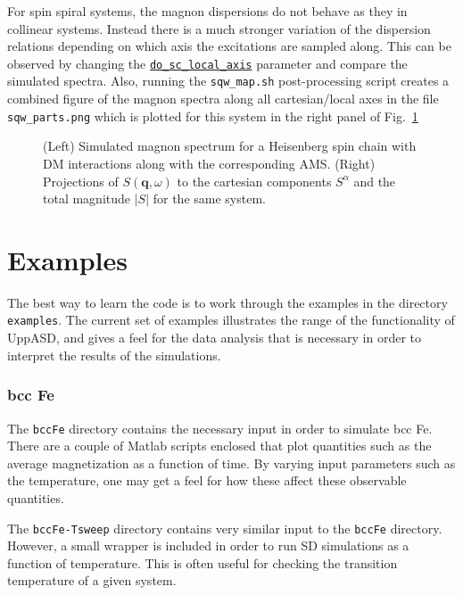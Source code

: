 \documentclass[11pt,fleqn,a4]{book} %
\newcommand{\rkeyword}[1]{\hyperref[#1]{\texttt{#1}}}
\begin{document}
For spin spiral systems, the magnon dispersions do not behave as they in collinear systems. Instead there is a much stronger variation of the dispersion relations depending on which axis the excitations are sampled along. This can be observed by changing the \rkeyword{do_sc_local_axis} parameter and compare the simulated spectra. Also, running the \texttt{sqw_map.sh} post-processing script creates a combined figure of the magnon spectra along all cartesian/local axes in the file \texttt{sqw_parts.png} which is plotted for this system in the right panel of Fig.~\ref{fig:sqw_heischaindm}
\begin{figure}[h!]
\caption{(Left) Simulated magnon spectrum for a Heisenberg spin chain with DM interactions along with the corresponding AMS.
(Right) Projections of $S(\mathbf{q},\omega)$ to the cartesian components $S^\alpha$ and the total magnitude $|S|$ for the same system.}
\label{fig:sqw_heischaindm}
\end{figure}

\chapter{Examples}
The best way to learn the code is to work through the examples in the directory \texttt{examples}. The current set of examples illustrates the range of the functionality of UppASD, and gives a feel for the data analysis that is necessary in order to interpret the results of the simulations.

\subsection{bcc Fe}
The \texttt{bccFe} directory contains the necessary input in order to simulate bcc Fe. There are a couple of Matlab scripts enclosed that plot quantities such as the average magnetization as a function of time. By varying input parameters such as the temperature, one may get a feel for how these affect these observable quantities.

The \texttt{bccFe-Tsweep} directory contains very similar input to the \texttt{bccFe} directory. However, a small wrapper is included in order to run SD simulations as a function of temperature. This is often useful for checking the transition temperature of a given system. 

\end{document}
